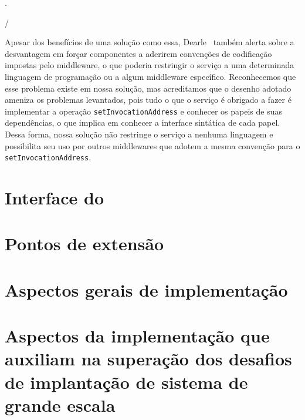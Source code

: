 .

/

Apesar dos benefícios de uma solução como essa, Dearle~\cite{Dearle2007PastPresentFuture} também alerta sobre a desvantagem em forçar componentes a aderirem convenções de codificação impostas pelo middleware, o que poderia restringir o serviço a uma determinada linguagem de programação ou a algum middleware específico. Reconhecemos que esse problema existe em nossa solução, mas acreditamos que o desenho adotado ameniza os problemas levantados, pois tudo o que o serviço é obrigado a fazer é implementar a operação \texttt{setInvocationAddress} e conhecer os papeis de suas dependências, o que implica em conhecer a interface sintática de cada papel. Dessa forma, nossa solução não restringe o serviço a nenhuma linguagem e possibilita seu uso por outros middlewares que adotem a mesma convenção para o \texttt{setInvocationAddress}.

\section{Interface do \ee}
\label{sec:interface}

\section{Pontos de extensão}
\label{sec:extensao}

\section{Aspectos gerais de implementação}

\section{Aspectos da implementação que auxiliam na superação dos desafios de implantação de sistema de grande escala}
